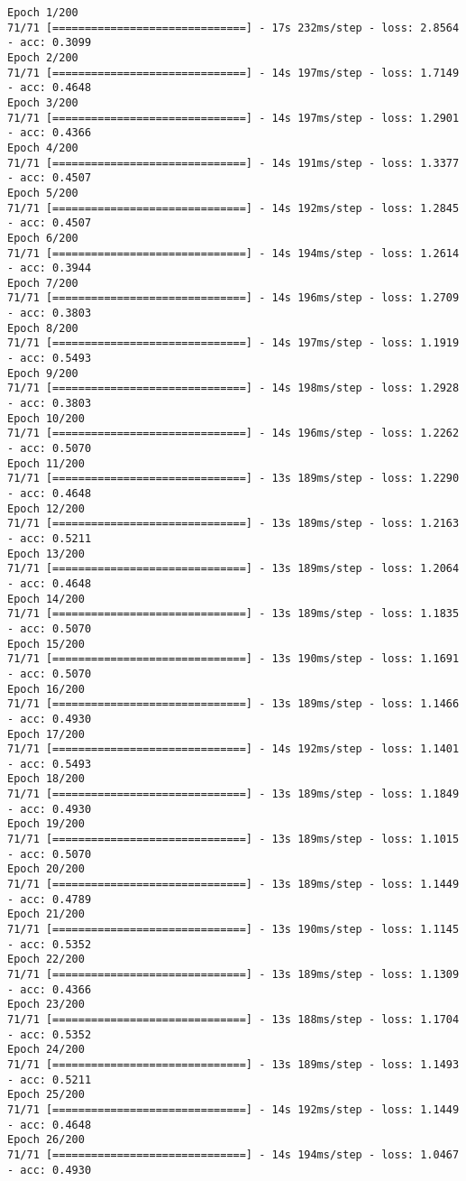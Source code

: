 \documentclass[11pt]{article}
\begin{document}
    \begin{Verbatim}[commandchars=\\\{\}]
Epoch 1/200
71/71 [==============================] - 17s 232ms/step - loss: 2.8564 - acc: 0.3099
Epoch 2/200
71/71 [==============================] - 14s 197ms/step - loss: 1.7149 - acc: 0.4648
Epoch 3/200
71/71 [==============================] - 14s 197ms/step - loss: 1.2901 - acc: 0.4366
Epoch 4/200
71/71 [==============================] - 14s 191ms/step - loss: 1.3377 - acc: 0.4507
Epoch 5/200
71/71 [==============================] - 14s 192ms/step - loss: 1.2845 - acc: 0.4507
Epoch 6/200
71/71 [==============================] - 14s 194ms/step - loss: 1.2614 - acc: 0.3944
Epoch 7/200
71/71 [==============================] - 14s 196ms/step - loss: 1.2709 - acc: 0.3803
Epoch 8/200
71/71 [==============================] - 14s 197ms/step - loss: 1.1919 - acc: 0.5493
Epoch 9/200
71/71 [==============================] - 14s 198ms/step - loss: 1.2928 - acc: 0.3803
Epoch 10/200
71/71 [==============================] - 14s 196ms/step - loss: 1.2262 - acc: 0.5070
Epoch 11/200
71/71 [==============================] - 13s 189ms/step - loss: 1.2290 - acc: 0.4648
Epoch 12/200
71/71 [==============================] - 13s 189ms/step - loss: 1.2163 - acc: 0.5211
Epoch 13/200
71/71 [==============================] - 13s 189ms/step - loss: 1.2064 - acc: 0.4648
Epoch 14/200
71/71 [==============================] - 13s 189ms/step - loss: 1.1835 - acc: 0.5070
Epoch 15/200
71/71 [==============================] - 13s 190ms/step - loss: 1.1691 - acc: 0.5070
Epoch 16/200
71/71 [==============================] - 13s 189ms/step - loss: 1.1466 - acc: 0.4930
Epoch 17/200
71/71 [==============================] - 14s 192ms/step - loss: 1.1401 - acc: 0.5493
Epoch 18/200
71/71 [==============================] - 13s 189ms/step - loss: 1.1849 - acc: 0.4930
Epoch 19/200
71/71 [==============================] - 13s 189ms/step - loss: 1.1015 - acc: 0.5070
Epoch 20/200
71/71 [==============================] - 13s 189ms/step - loss: 1.1449 - acc: 0.4789
Epoch 21/200
71/71 [==============================] - 13s 190ms/step - loss: 1.1145 - acc: 0.5352
Epoch 22/200
71/71 [==============================] - 13s 189ms/step - loss: 1.1309 - acc: 0.4366
Epoch 23/200
71/71 [==============================] - 13s 188ms/step - loss: 1.1704 - acc: 0.5352
Epoch 24/200
71/71 [==============================] - 13s 189ms/step - loss: 1.1493 - acc: 0.5211
Epoch 25/200
71/71 [==============================] - 14s 192ms/step - loss: 1.1449 - acc: 0.4648
Epoch 26/200
71/71 [==============================] - 14s 194ms/step - loss: 1.0467 - acc: 0.4930

\end{Verbatim}
\end{document}
